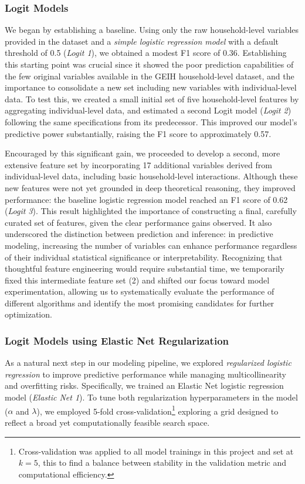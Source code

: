 \documentclass[12pt,a4paper,onecolumn]{article}
\begin{document}
\subsubsection{Logit Models}
We began by establishing a baseline. Using only the raw household-level variables provided in the dataset and a \textit{simple logistic regression model} with a default threshold of 0.5 (\textit{Logit 1}), we obtained a modest F1 score of 0.36. Establishing this starting point was crucial since it showed the poor prediction capabilities of the few original variables available in the GEIH household-level dataset, and the importance to consolidate a new set including new variables with individual-level data. To test this, we created a small initial set of five household-level features by aggregating individual-level data, and estimated a second Logit model (\textit{Logit 2}) following the same specifications from its predecessor. This improved our model’s predictive power substantially, raising the F1 score to approximately 0.57.

Encouraged by this significant gain, we proceeded to develop a second, more extensive feature set by incorporating 17 additional variables derived from individual-level data, including basic household-level interactions. Although these new features were not yet grounded in deep theoretical reasoning, they improved performance: the baseline logistic regression model reached an F1 score of 0.62 (\textit{Logit 3}). This result highlighted the importance of constructing a final, carefully curated set of features, given the clear performance gains observed. It also underscored the distinction between prediction and inference: in predictive modeling, increasing the number of variables can enhance performance regardless of their individual statistical significance or interpretability. Recognizing that thoughtful feature engineering would require substantial time, we temporarily fixed this intermediate feature set (2) and shifted our focus toward model experimentation, allowing us to systematically evaluate the performance of different algorithms and identify the most promising candidates for further optimization.

\subsubsection{Logit Models using Elastic Net Regularization}

As a natural next step in our modeling pipeline, we explored \textit{regularized logistic regression} to improve predictive performance while managing multicollinearity and overfitting risks. Specifically, we trained an Elastic Net logistic regression model (\textit{Elastic Net 1}). To tune both regularization hyperparameters in the model ($\alpha$ and $\lambda$), we employed 5-fold cross-validation\footnote{Cross-validation was applied to all model trainings in this project and set at $k=5$, this to find a balance between stability in the validation metric and computational efficiency.} exploring a grid designed to reflect a broad yet computationally feasible search space.
\end{document}
